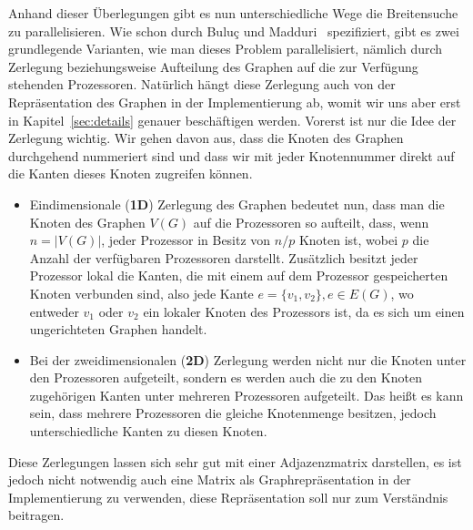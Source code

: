 \documentclass[11pt,a4paper]{article}
\begin{document}
Anhand dieser Überlegungen gibt es nun unterschiedliche Wege die Breitensuche zu parallelisieren. Wie schon durch Buluç und Madduri~\cite{buluc} spezifiziert, gibt es zwei grundlegende Varianten, wie man dieses Problem parallelisiert, nämlich durch Zerlegung beziehungsweise Aufteilung des Graphen auf die zur Verfügung stehenden Prozessoren. Natürlich hängt diese Zerlegung auch von der Repräsentation des Graphen in der Implementierung ab, womit wir uns aber erst in Kapitel~\ref{sec:details} genauer beschäftigen werden. Vorerst ist nur die Idee der Zerlegung wichtig. Wir gehen davon aus, dass die Knoten des Graphen durchgehend nummeriert sind und dass wir mit jeder Knotennummer direkt auf die Kanten dieses Knoten zugreifen können.
\begin{itemize}
	\item{Eindimensionale (\textbf{1D}) Zerlegung des Graphen bedeutet nun, dass man die Knoten des Graphen \(V(G)\) auf die Prozessoren so aufteilt, dass, wenn \(n = |V(G)|\), jeder Prozessor in Besitz von \(n / p\) Knoten ist, wobei \(p\) die Anzahl der verfügbaren Prozessoren darstellt. Zusätzlich besitzt jeder Prozessor lokal die Kanten, die mit einem auf dem Prozessor gespeicherten Knoten verbunden sind, also jede Kante \(e = \{v_{1},v_{2}\}, e \in E(G)\), wo entweder \(v_{1}\) oder \(v_{2}\) ein lokaler Knoten des Prozessors ist, da es sich um einen ungerichteten Graphen handelt.}
	\item{Bei der zweidimensionalen (\textbf{2D})  Zerlegung werden nicht nur die Knoten unter den Prozessoren aufgeteilt, sondern es werden auch die zu den Knoten zugehörigen Kanten unter mehreren Prozessoren aufgeteilt. Das heißt es kann sein, dass mehrere Prozessoren die gleiche Knotenmenge besitzen, jedoch unterschiedliche Kanten zu diesen Knoten.}
\end{itemize}
Diese Zerlegungen lassen sich sehr gut mit einer Adjazenzmatrix darstellen, es ist jedoch nicht notwendig auch eine Matrix als Graphrepräsentation in der Implementierung zu verwenden, diese Repräsentation soll nur zum Verständnis beitragen.
\end{document}
